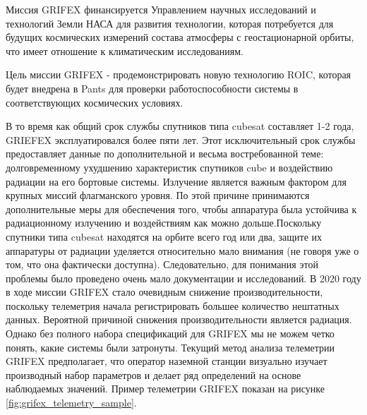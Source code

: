 \documentclass[14pt, a4paper]{../cls/coursework}
\begin{document}
    Миссия GRIFEX финансируется Управлением научных исследований и технологий Земли НАСА для развития технологии, которая потребуется для будущих космических измерений состава атмосферы с геостационарной орбиты, что имеет отношение к климатическим исследованиям.

    Цель миссии GRIFEX - продемонстрировать новую технологию ROIC, которая будет внедрена в Pants для проверки работоспособности системы в соответствующих космических условиях.

    В то время как общий срок службы спутников типа cubesat составляет 1-2 года, GRIEFEX эксплуатировался более пяти лет. Этот исключительный срок службы предоставляет данные по дополнительной и весьма востребованной теме: долговременному ухудшению характеристик спутников cube и воздействию радиации на его бортовые системы. Излучение является важным фактором для крупных миссий флагманского уровня. По этой причине принимаются дополнительные меры для обеспечения того, чтобы аппаратура была устойчива к радиационному излучению и воздействиям как можно дольше.Поскольку спутники типа cubesat находятся на орбите всего год или два, защите их аппаратуры от радиации уделяется относительно мало внимания (не говоря уже о том, что она фактически доступна). Следовательно, для понимания этой проблемы было проведено очень мало документации и исследований. В 2020 году в ходе миссии GRIFEX стало очевидным снижение производительности, поскольку телеметрия начала регистрировать большее количество нештатных данных. Вероятной причиной снижения производительности является радиация. Однако без полного набора спецификаций для GRIFEX мы не можем четко понять, какие системы были затронуты. Текущий метод анализа телеметрии GRIFEX предполагает, что оператор наземной станции визуально изучает производный набор параметров и делает ряд определений на основе наблюдаемых значений. Пример телеметрии GRIFEX показан на рисунке \ref{fig:grifex_telemetry_sample}.
\end{document}
